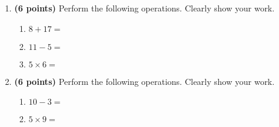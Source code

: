 \documentclass[12pt]{amsart}
\begin{document}
\newpage
\begin{enumerate}
\item {\bf (6 points)} 
 Perform the following operations. Clearly show your work. \begin{enumerate}


\def \a{8}\def \b{17}\def \apb{25}

 
\item $\a + \b = $

\vspace{2cm}
\def \a{11}\def \dif{6}\def \b{5}

 
\item $\a - \b = $

\vspace{2cm}
\def \a{5}\def \b{6}\def \ab{11}

 
\item $\a \times \b = $ 

\vspace{2cm}
\def \vshift{1}\def \hshift{0}\def \chang{-2}\def \findval{-2}\def \yval{5}

 
\end{enumerate}


\newpage
\item {\bf (6 points)} 
 Perform the following operations. Clearly show your work. \begin{enumerate}


\def \a{10}\def \dif{7}\def \b{3}

 
\item $\a - \b = $

\vspace{2cm}
\def \a{5}\def \b{9}\def \ab{14}

 
\item $\a \times \b = $ 

\vspace{2cm}
\def \vshift{1}\def \hshift{4}\def \chang{2}\def \findval{6}\def \yval{-3}

 
\end{enumerate}


\newpage\end{enumerate} 
\end{document}
